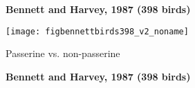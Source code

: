 {%



  \textbf{Bennett and Harvey, 1987 (398 birds)}

  \begin{center}
    \texttt{[image: figbennettbirds398\_v2\_noname]}
  \end{center}

  Passerine vs. non-passerine


  \textbf{Bennett and Harvey, 1987 (398 birds)}

}
